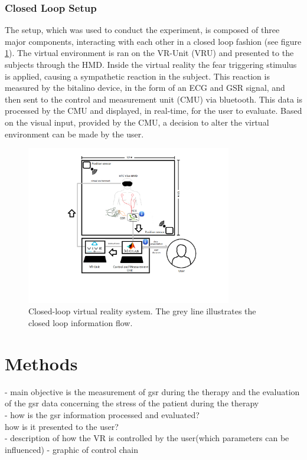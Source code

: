\subsubsection{Closed Loop Setup}
The setup, which was used to conduct the experiment, is composed of three major components, interacting with each other in a closed loop fashion (see figure \ref{setupImg}). The virtual environment is ran on the VR-Unit (VRU) and presented to the subjects through the HMD. Inside the virtual reality the fear triggering stimulus is applied, causing a sympathetic reaction in the subject. This reaction is measured by the bitalino device, in the form of an ECG and GSR signal, and then sent to the control and measurement unit (CMU) via bluetooth. This data is processed by the CMU and displayed, in real-time, for the user to evaluate. Based on the visual input, provided by the CMU, a decision to alter the virtual environment can be made by the user.  

\begin{figure}[ht]
\centering
\includegraphics[width=0.8\textwidth]{images/setup.png}
\caption{Closed-loop virtual reality system. The grey line illustrates the closed loop information flow.}
\label{setupImg}
\end{figure}



\newpage
\section{Methods}\label{Methods}
- main objective is the measurement of gsr during the therapy and the evaluation of the gsr data concerning the stress of the patient during the therapy\\
- how is the gsr information processed and evaluated?\\
how is it presented to the user?\\
- description of how the VR is controlled by the user(which parameters can be influenced)
- graphic of control chain
